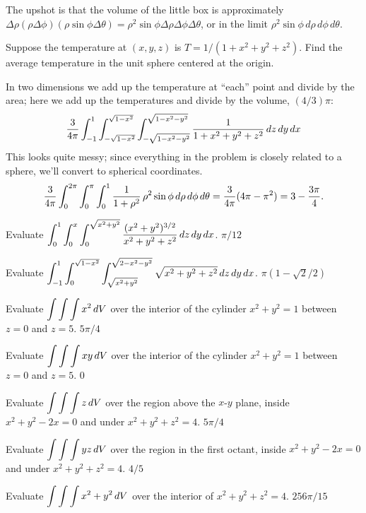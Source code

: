 The upshot is that the volume of the little box is approximately
$\Delta\rho(\rho\Delta\phi)(\rho\sin\phi\Delta\theta)
=\rho^2\sin\phi\Delta\rho\Delta\phi\Delta\theta$, or in the limit
$\rho^2\sin\phi\,d\rho\,d\phi\,d\theta$.

\example Suppose the temperature at $(x,y,z)$ is
$T=1/(1+x^2+y^2+z^2)$. Find the average temperature in the unit sphere
centered at the origin.

In two dimensions we add up the temperature at ``each'' point and
divide by the area; here we add up the temperatures and divide by the
volume, $(4/3)\pi$:
$${3\over4\pi}\int_{-1}^1\int_{-\sqrt{1-x^2}}^{\sqrt{1-x^2}}
\int_{-\sqrt{1-x^2-y^2}}^{\sqrt{1-x^2-y^2}}
{1\over1+x^2+y^2+z^2}\,dz\,dy\,dx
$$
This looks quite messy; since everything in the problem is closely
related to a sphere, we'll convert to spherical coordinates.
$${3\over4\pi}\int_0^{2\pi}\int_0^\pi
\int_0^1
{1\over1+\rho^2}\,\rho^2\sin\phi\,d\rho\,d\phi\,d\theta
={3\over4\pi}(4\pi -\pi^2)=3-{3\pi\over4}.
$$
\endexample

\exercises

\exercise Evaluate $\displaystyle\int_{0}^{1}\int_{0}^{x}\int_{0}^{\sqrt{x^2+y^2}}
{(x^2+y^2)^{3/2}\over x^2+y^2+z^2}\,dz\,dy\,dx$.
\answer $\pi/12$
\endanswer

\endexercise

\exercise Evaluate $\displaystyle\int_{-1}^{1}\int_{0}^{\sqrt{1-x^2}}
\int_{\sqrt{x^2+y^2}}^{\sqrt{2-x^2-y^2}}\sqrt{x^2+y^2+z^2}\,dz\,dy\,dx$.
\answer $\pi(1-\sqrt2/2)$
\endanswer
\endexercise

\exercise Evaluate $\displaystyle\int\int\int x^2\,dV$
over the interior of the cylinder $x^2+y^2=1$ between $z=0$ and $z=5$.
\answer $5\pi/4$
\endanswer
\endexercise

\exercise Evaluate $\displaystyle\int\int\int xy\,dV$
over the interior of the cylinder $x^2+y^2=1$ between $z=0$ and $z=5$.
\answer $0$
\endanswer
\endexercise

\exercise Evaluate $\displaystyle\int\int\int z\,dV$
over the region above the $x$-$y$ plane, inside $x^2+y^2-2x=0$ and
under $x^2+y^2+z^2=4$.
\answer $5\pi/4$
\endanswer
\endexercise

\exercise Evaluate $\displaystyle\int\int\int yz\,dV$
over the region in the first octant, inside $x^2+y^2-2x=0$ and 
under $x^2+y^2+z^2=4$.
\answer $4/5$
\endanswer
\endexercise

\exercise Evaluate $\displaystyle\int\int\int x^2+y^2\,dV$
over the interior of $x^2+y^2+z^2=4$.
\answer $256\pi/15$
\endanswer
\endexercise

